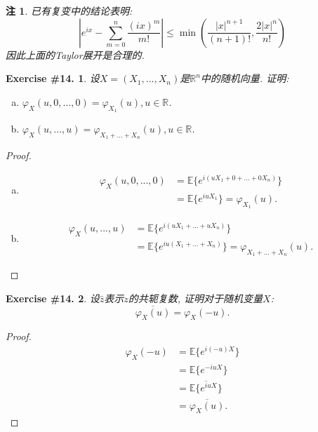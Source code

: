 \documentclass[UTF8, a4paper]{article}
\newtheorem{exercise}{Exercise \#14.}
\newtheorem*{remark}{注}
\begin{document}
\begin{remark}
已有复变中的结论表明:
$$
\left|e^{i x}-\sum_{m=0}^n \frac{(i x)^m}{m!}\right| \leq \min \left(\frac{|x|^{n+1}}{(n+1)!}, \frac{2|x|^n}{n!}\right)
$$
因此上面的Taylor展开是合理的.
\end{remark}



\begin{framed}
\begin{exercise}
设\(X = (X_1, ..., X_n)\)是\(\mathbb{R}^n\)中的随机向量.
证明:
\begin{enumerate}[a)]
    \item \(\varphi_X(u, 0, ..., 0) = \varphi_{X_1}(u), u\in \mathbb{R}\).
    \item \(\varphi_X(u, ..., u) = \varphi_{X_1 + ... + X_n}(u), u \in \mathbb{R}\).
\end{enumerate}
\end{exercise}
\end{framed}

\begin{proof}
\begin{enumerate}[a)]
    \item 
    $$\begin{aligned}
        \varphi_X(u, 0, ..., 0) &= \mathbb{E}\{e^{i(uX_1 + 0 + ... + 0X_n)}\} \\
        &= \mathbb{E}\{e^{iuX_1}\} = \varphi_{X_1}(u).
    \end{aligned}$$
    \item 
    $$\begin{aligned}
        \varphi_X(u, ..., u) &= \mathbb{E}\{e^{i(uX_1 + ... + uX_n)}\} \\
        &= \mathbb{E}\{e^{iu(X_1 + ... + X_n)}\} = \varphi_{X_1 + ... + X_n}(u).
    \end{aligned}$$
\end{enumerate}
\end{proof}



\begin{framed}
\begin{exercise}
设\(\bar{z}\)表示\(z\)的共轭复数, 证明对于随机变量\(X\): 
$$
\overline{\varphi_X(u)}=\varphi_X(-u) .
$$
\end{exercise}
\end{framed}

\begin{proof}
$$
\begin{aligned}
    \varphi_X(-u) &= \mathbb{E}\{e^{i(-u)X}\} \\
    &= \mathbb{E}\{e^{-iuX}\} \\
    &= \overline{\mathbb{E}\{e^{iuX}\}} \\
    &= \overline{\varphi_X(u)}.
\end{aligned}
$$
\end{proof}
\end{document}
